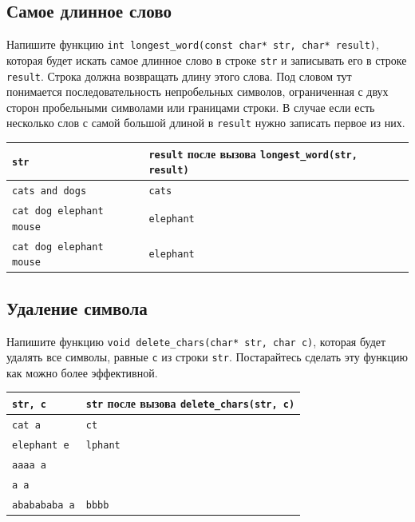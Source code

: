 \documentclass{article}
\begin{document}
\subsection{Самое длинное слово}
Напишите функцию \texttt{int longest\_word(const char* str, char* result)}, которая будет искать самое длинное слово в строке \texttt{str} и записывать его в строке \texttt{result}. Строка должна возвращать длину этого слова. Под словом тут понимается последовательность непробельных символов, ограниченная с двух сторон пробельными символами или границами строки.
В случае если есть несколько слов с самой большой длиной в \texttt{result} нужно записать первое из них.

\begin{center}
\begin{tabular}{ l | l }
 \texttt{str} & \texttt{result} после вызова \texttt{longest\_word(str, result)} \\ \hline
 \texttt{cats and dogs} & \texttt{cats} \\
 \texttt{cat dog elephant mouse} & \texttt{elephant} \\
 \texttt{cat \quad dog \quad\quad elephant mouse} & \texttt{elephant} \\
\end{tabular}
\end{center}

\subsection{Удаление символа}
Напишите функцию \texttt{void delete\_chars(char* str, char c)}, которая будет удалять все символы, равные \texttt{c} из строки \texttt{str}. Постарайтесь сделать эту функцию как можно более эффективной.

\begin{center}
\begin{tabular}{ l | l }
 \texttt{str, c} & \texttt{str} после вызова \texttt{delete\_chars(str, c)} \\ \hline
 \texttt{cat a} & \texttt{ct} \\
 \texttt{elephant e} & \texttt{lphant} \\
 \texttt{aaaa a} & \texttt{} \\
 \texttt{a a} & \texttt{} \\
 \texttt{ababababa a} & \texttt{bbbb} \\
\end{tabular}
\end{center}
\end{document}
